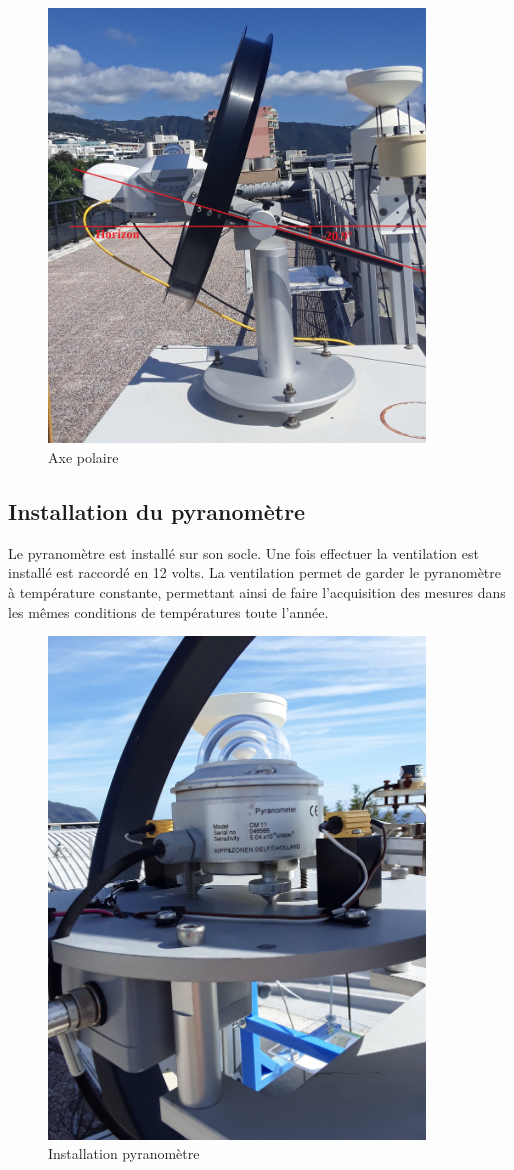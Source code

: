 \documentclass[12pt,a4paper]{article}
\begin{document}
\begin{flushleft}
\begin{figure}[H]
\centering
\includegraphics[width=10cm]{image/montage/3.jpg} 
\caption{Axe polaire}
\end{figure}

\subsection{Installation du pyranomètre}

Le pyranomètre est installé sur son socle. Une fois effectuer la ventilation est installé est raccordé en 12 volts. La ventilation permet de garder le pyranomètre à température constante, permettant ainsi de faire l'acquisition des mesures dans les mêmes conditions de températures toute l'année.

\begin{figure}[H]
\centering
\includegraphics[width=10cm, angle=-90]{image/montage/4.jpg} 
\caption{Installation pyranomètre}
\end{figure}


\end{flushleft}
\end{document}
